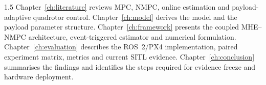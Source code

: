 \begin{spacing}{1.5}
Chapter~\ref{ch:literature} reviews MPC, NMPC, online estimation and payload-adaptive quadrotor control. Chapter~\ref{ch:model} derives the model and the payload parameter structure. Chapter~\ref{ch:framework} presents the coupled MHE--NMPC architecture, event-triggered estimator and numerical formulation. Chapter~\ref{ch:evaluation} describes the ROS~2/PX4 implementation, paired experiment matrix, metrics and current SITL evidence. Chapter~\ref{ch:conclusion} summarises the findings and identifies the steps required for evidence freeze and hardware deployment.

\end{spacing}
\newpage
